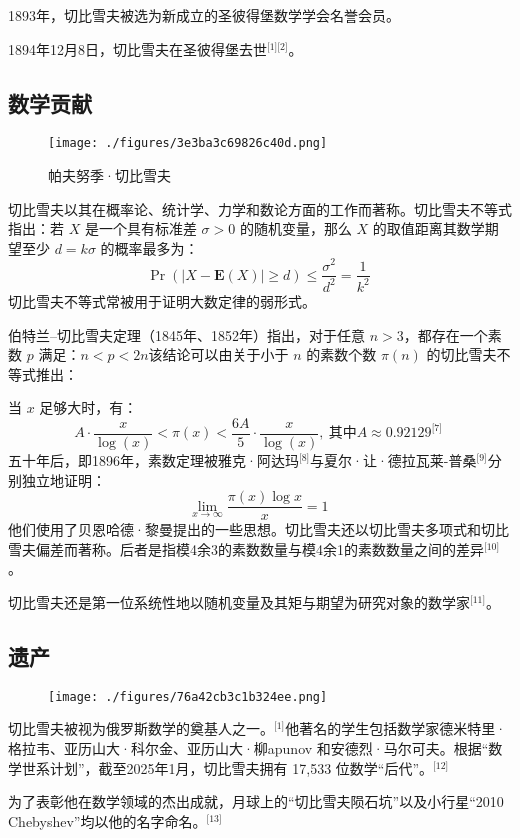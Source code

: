 1893年，切比雪夫被选为新成立的圣彼得堡数学学会名誉会员。

1894年12月8日，切比雪夫在圣彼得堡去世\(^\text{[1][2]}\)。
\subsection{数学贡献}
\begin{figure}[ht]
\centering
\texttt{[image: ./figures/3e3ba3c69826c40d.png]}
\caption{帕夫努季·切比雪夫} \label{fig_PFNJ_2}
\end{figure}
切比雪夫以其在概率论、统计学、力学和数论方面的工作而著称。切比雪夫不等式指出：若 $X$ 是一个具有标准差 $\sigma > 0$ 的随机变量，那么 $X$ 的取值距离其数学期望至少 $d = k\sigma$ 的概率最多为：
$$
\Pr(|X - \mathbf{E}(X)| \geq d) \leq \frac{\sigma^2}{d^2} = \frac{1}{k^2}~
$$
切比雪夫不等式常被用于证明大数定律的弱形式。

伯特兰–切比雪夫定理（1845年、1852年）指出，对于任意 $n > 3$，都存在一个素数 $p$ 满足：$n < p < 2n$该结论可以由关于小于 $n$ 的素数个数 $\pi(n)$ 的切比雪夫不等式推出：

当 $x$ 足够大时，有：
$$
A \cdot \frac{x}{\log(x)} < \pi(x) < \frac{6A}{5} \cdot \frac{x}{\log(x)},\ \text{其中}A \approx 0.92129^\text{[7]}~
$$
五十年后，即1896年，素数定理被雅克·阿达玛\(^\text{[8]}\)与夏尔·让·德拉瓦莱-普桑\(^\text{[9]}\)分别独立地证明：
$$
\lim_{x \to \infty} \frac{\pi(x) \log x}{x} = 1~
$$
他们使用了贝恩哈德·黎曼提出的一些思想。切比雪夫还以切比雪夫多项式和切比雪夫偏差而著称。后者是指模4余3的素数数量与模4余1的素数数量之间的差异\(^\text{[10]}\)。

切比雪夫还是第一位系统性地以随机变量及其矩与期望为研究对象的数学家\(^\text{[11]}\)。
\subsection{遗产}
\begin{figure}[ht]
\centering
\texttt{[image: ./figures/76a42cb3c1b324ee.png]}
\caption{} \label{fig_PFNJ_3}
\end{figure}
切比雪夫被视为俄罗斯数学的奠基人之一。\(^\text{[1]}\)他著名的学生包括数学家德米特里·格拉韦、亚历山大·科尔金、亚历山大·柳apunov 和安德烈·马尔可夫。根据“数学世系计划”，截至2025年1月，切比雪夫拥有 17,533 位数学“后代”。\(^\text{[12]}\)

为了表彰他在数学领域的杰出成就，月球上的“切比雪夫陨石坑”以及小行星“2010 Chebyshev”均以他的名字命名。\(^\text{[13]}\)
